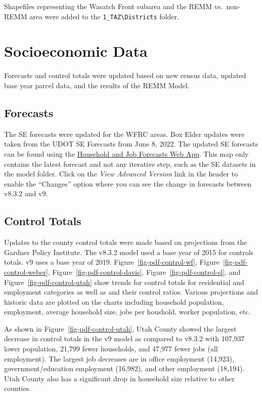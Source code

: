 \documentclass[
  letterpaper,
  DIV=11,
  numbers=noendperiod]{scrreprt}
\begin{document}
Shapefiles representing the Wasatch Front subarea and the REMM
vs.~non-REMM area were added to the
\texttt{1\_TAZ\textbackslash{}Districts} folder.

\hypertarget{socioeconomic-data}{%
\section{Socioeconomic Data}\label{socioeconomic-data}}

Forecasts and control totals were updated based on new census data,
updated base year parcel data, and the results of the REMM Model.

\hypertarget{forecasts}{%
\subsection{Forecasts}\label{forecasts}}

The SE forecasts were updated for the WFRC areas. Box Elder updates were
taken from the UDOT SE Forecasts from June 8, 2022. The updated SE
forecasts can be found using the
\href{https://wfrc.org/household-job-forecast-map}{Household and Job
Forecasts Web App}. This map only contains the latest forecast and not
any iterative step, such as the SE datasets in the model folder. Click
on the \emph{View Advanced Version} link in the header to enable the
``Changes'' option where you can see the change in forecasts between
v8.3.2 and v9.

\hypertarget{control-totals}{%
\subsection{Control Totals}\label{control-totals}}

Updates to the county control totals were made based on projections from
the Gardner Policy Institute. The v8.3.2 model used a base year of 2015
for controls totals. v9 uses a base year of 2019.
Figure~\ref{fig-pdf-control-wf}, Figure~\ref{fig-pdf-control-weber},
Figure~\ref{fig-pdf-control-davis}, Figure~\ref{fig-pdf-control-sl}, and
Figure~\ref{fig-pdf-control-utah} show trends for control totals for
residential and employment categories as well as and their control
ratios. Various projections and historic data are plotted on the charts
including household population, employment, average household size, jobs
per houshold, worker population, etc.

As shown in Figure~\ref{fig-pdf-control-utah}, Utah County showed the
largest decrease in control totals in the v9 model as compared to v8.3.2
with 107,937 lower population, 21,799 fewer households, and 47,977 fewer
jobs (all employment). The largest job decreases are in office
employment (14,923), government/education employment (16,982), and other
employment (18,194). Utah County also has a significant drop in
household size relative to other counties.
\end{document}
